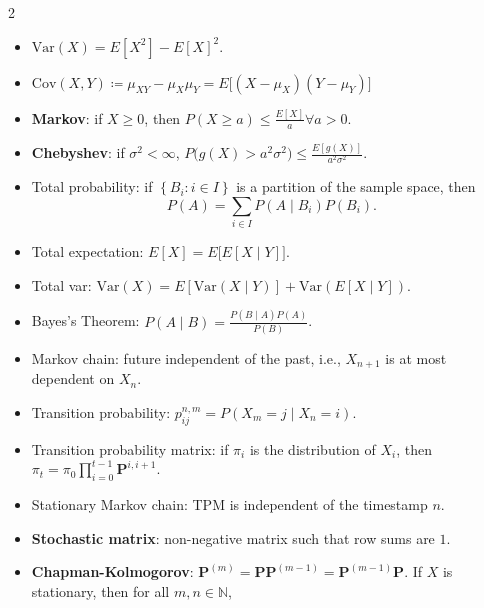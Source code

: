 \documentclass[8pt]{article}
\begin{document}
    \begin{multicols*}{2}
        \begin{itemize}
            \setlength\itemsep{0.1em}
            \item $\mathrm{Var}\left(X\right) = E\left[X^2\right] - E\left[X\right]^2$.
            \item $\mathrm{Cov}\left(X, Y\right) \coloneqq \mu_{XY} - \mu_X\mu_Y = E\bigl[\left(X - \mu_X\right)\left(Y - \mu_Y\right)\bigr]$
            \item \textbf{Markov}: if $X \geq 0$, then $P\left(X \geq a\right) \leq \frac{E\left[X\right]}{a} \forall a > 0$.
            \item \textbf{Chebyshev}: if $\sigma^2 < \infty$, $P\bigl(g\left(X\right) > a^2\sigma^2\bigr) \leq \frac{E[g\left(X\right)]}{a^2\sigma^2}$.
            \item Total probability: if $\left\{B_i \colon i \in I\right\}$ is a partition of the sample space, then
            \begin{equation*}
                P\left(A\right) = \sum_{i \in I}P\left(A \mid B_i\right)P\left(B_i\right).
            \end{equation*}
            \item Total expectation: $E\left[X\right] = E\bigl[E\left[X \mid Y\right]\bigr]$.
            \item Total var: $\mathrm{Var}\left(X\right) = E\left[\mathrm{Var}\left(X \mid Y\right)\right] + \mathrm{Var}\left(E\left[X \mid Y\right]\right)$.
            \item Bayes's Theorem: $P\left(A \mid B\right) = \frac{P\left(B \mid A\right)P\left(A\right)}{P\left(B\right)}$.
            \item Markov chain: future independent of the past, i.e., $X_{n + 1}$ is at most dependent on $X_n$.
            \item Transition probability: $p_{ij}^{n, m} = P\left(X_m = j \mid X_n = i\right)$.
            \item Transition probability matrix: if $\pi_i$ is the distribution of $X_i$, then $\pi_t = \pi_0\prod_{i = 0}^{t - 1}\bm{P}^{i, i + 1}$.
            \item Stationary Markov chain: TPM is independent of the timestamp $n$.
            \item \textbf{Stochastic matrix}: non-negative matrix such that row sums are $1$.
            \item \textbf{Chapman-Kolmogorov}: $\bm{P}^{\left(m\right)} = \bm{P}\bm{P}^{\left(m - 1\right)} = \bm{P}^{\left(m - 1\right)}\bm{P}$. If $X$ is stationary, then for all $m, n \in \mathbb{N}$,

\end{itemize}
\end{multicols*}
\end{document}
